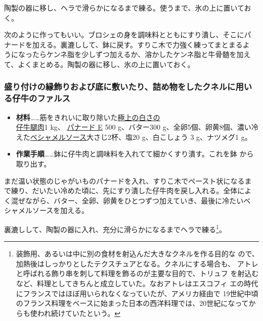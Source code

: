 \begin{recette}
陶製の器に移し、ヘラで滑らかになるまで練る。使うまで、氷の上に置いてお
く。

次のように作ってもいい。ブロシェの身を調味料とともにすり潰し、そこにパ
ナードを加える。裏漉しして、鉢に戻す。すりこ木で力強く練ってまとまるよ
うになったらケンネ脂を少しずつ加えるか、溶かしたケンネ脂と牛骨髄を加え
て、よくまとめる。陶製の器に移し、氷の上に置いておく。

\maeaki

\hypertarget{farce-de-veau-pour-bordures}{%
\subsubsection{盛り付けの縁飾りおよび底に敷いたり、詰め物をしたクネルに用いる仔牛のファルス}\label{farce-de-veau-pour-bordures}}



\begin{itemize}
\item
  \textbf{材料}\ldots{}\ldots{}筋をきれいに取り除いた\ul{極上の白さの\\仔牛腿肉}1
  kg、 \protect\hyperlink{panade-e}{パナード E} 500 g、バター300
  g、全卵5個、卵黄8個、濃い冷
  えた\protect\hyperlink{sauce-bechamel}{ベシャメルソース}大さじ2杯、塩20
  g、白こしょう 3 g、ナツメグ1 g。
\item
  \textbf{作業手順}\ldots{}\ldots{}鉢に仔牛肉と調味料を入れてて細かくすり潰す。これを鉢
  から取り出す。
\end{itemize}

まだ温い状態のじゃがいものパナードを入れ、すりこ木でペースト状になるま
で練り、だいたい冷めた頃に、先にすり潰した仔牛肉を戻し入れる。全体によ
く混ぜながら、バター、全卵、卵黄をひとつずつ加えていき、最後に冷たいベ
シャメルソースを加える。

裏漉しして、陶製の器に入れ、充分に滑らかになるまでヘラで練る\footnote{装飾用、あるいは中に別の食材を射込んだ大きなクネルを作る目的な
  ので、加熱後はしっかりとしたテクスチュアとなる。クネルにする場合も、
  アトレと呼ばれる飾り串を刺して料理を飾るのが主要な目的で、トリュフ
  を射込むなど、料理としてきちんと成立していた。なおアトレはエスコフィ
  エの時代にフランスではほぼ用いられなくなっていたが、アメリカ経由で
  19世紀中頃のフランス料理をベースに始まった日本の西洋料理では、20世紀になってからも使われ続けていたという。}。


\end{recette}
